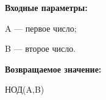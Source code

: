 \textbf{Входные параметры:}  
 
A --- первое число;
 
B --- второе число.

\textbf{Возвращаемое значение:}
 
НОД(A,B)